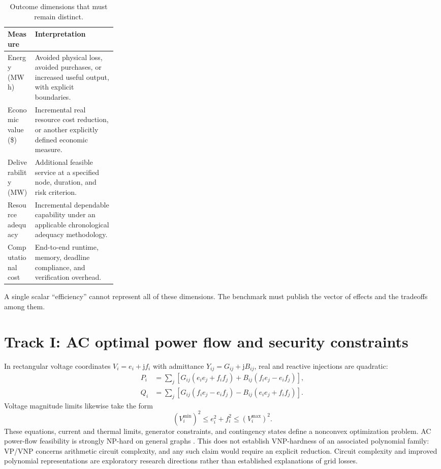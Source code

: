 \documentclass[11pt,letterpaper]{article}
\begin{document}
\begin{table}[htbp]
\centering\small
\caption{Outcome dimensions that must remain distinct.}
\begin{tabularx}{\linewidth}{p{0.25\linewidth}Y}
\toprule
Measure & Interpretation\\
\midrule
Energy (MWh) & Avoided physical loss, avoided purchases, or increased useful output, with explicit boundaries.\\
Economic value (\$) & Incremental real resource cost reduction, or another explicitly defined economic measure.\\
Deliverability (MW) & Additional feasible service at a specified node, duration, and risk criterion.\\
Resource adequacy & Incremental dependable capability under an applicable chronological adequacy methodology.\\
Computational cost & End-to-end runtime, memory, deadline compliance, and verification overhead.\\
\bottomrule
\end{tabularx}
\end{table}
A single scalar ``efficiency'' cannot represent all of these dimensions. The benchmark must publish the vector of effects and the tradeoffs among them.

\section{Track I: AC optimal power flow and security constraints}
In rectangular voltage coordinates $V_i=e_i+\mathrm{j}f_i$ with admittance $Y_{ij}=G_{ij}+\mathrm{j}B_{ij}$, real and reactive injections are quadratic:
\begin{align}
P_i&=\sum_j[G_{ij}(e_ie_j+f_if_j)+B_{ij}(f_ie_j-e_if_j)],\\
Q_i&=\sum_j[G_{ij}(f_ie_j-e_if_j)-B_{ij}(e_ie_j+f_if_j)].
\end{align}
Voltage magnitude limits likewise take the form
\begin{equation}
(V_i^{\min})^2\leq e_i^2+f_i^2\leq(V_i^{\max})^2.
\end{equation}
These equations, current and thermal limits, generator constraints, and contingency states define a nonconvex optimization problem. AC power-flow feasibility is strongly NP-hard on general graphs \cite{bienstock}. This does not establish VNP-hardness of an associated polynomial family: VP/VNP concerns arithmetic circuit complexity, and any such claim would require an explicit reduction. Circuit complexity and improved polynomial representations are exploratory research directions rather than established explanations of grid losses.
\end{document}
